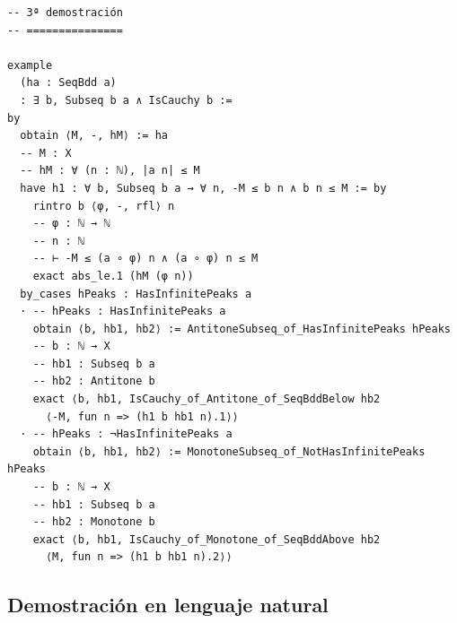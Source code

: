 \begin{verbatim}
-- 3ª demostración
-- ===============

example
  (ha : SeqBdd a)
  : ∃ b, Subseq b a ∧ IsCauchy b :=
by
  obtain ⟨M, -, hM⟩ := ha
  -- M : X
  -- hM : ∀ (n : ℕ), |a n| ≤ M
  have h1 : ∀ b, Subseq b a → ∀ n, -M ≤ b n ∧ b n ≤ M := by
    rintro b ⟨φ, -, rfl⟩ n
    -- φ : ℕ → ℕ
    -- n : ℕ
    -- ⊢ -M ≤ (a ∘ φ) n ∧ (a ∘ φ) n ≤ M
    exact abs_le.1 (hM (φ n))
  by_cases hPeaks : HasInfinitePeaks a
  · -- hPeaks : HasInfinitePeaks a
    obtain ⟨b, hb1, hb2⟩ := AntitoneSubseq_of_HasInfinitePeaks hPeaks
    -- b : ℕ → X
    -- hb1 : Subseq b a
    -- hb2 : Antitone b
    exact ⟨b, hb1, IsCauchy_of_Antitone_of_SeqBddBelow hb2
      ⟨-M, fun n => (h1 b hb1 n).1⟩⟩
  · -- hPeaks : ¬HasInfinitePeaks a
    obtain ⟨b, hb1, hb2⟩ := MonotoneSubseq_of_NotHasInfinitePeaks hPeaks
    -- b : ℕ → X
    -- hb1 : Subseq b a
    -- hb2 : Monotone b
    exact ⟨b, hb1, IsCauchy_of_Monotone_of_SeqBddAbove hb2
      ⟨M, fun n => (h1 b hb1 n).2⟩⟩
\end{verbatim}

\subsection{Demostración en lenguaje natural}

